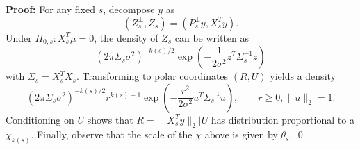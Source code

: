 \documentclass{imsart}
\newcommand{\todo}{\textcolor{red}{\textbf{To do: }}}
\begin{document}
{\bf Proof:}
For any fixed $s$, decompose $y$ as
$$
(Z^{\perp}_s,Z_s) = (P_s^{\perp}y, X_s^Ty).
$$
Under $H_{0,s}:X_s^T\mu=0$, the density of $Z_s$ can be written as
$$
(2 \pi \Sigma_s \sigma^2)^{-k(s)/2} \exp \left(-\frac{1}{2 \sigma^2} z^T\Sigma_s^{-1}z \right)
$$
with $\Sigma_s = X_s^TX_s$.
Transforming to polar coordinates $(R,U)$ yields a density
$$
(2 \pi \Sigma_s \sigma^2)^{-k(s)/2} r^{k(s)-1} \exp \left(-\frac{r^2}{2 \sigma^2} u^T\Sigma_s^{-1}u \right), \qquad r \geq 0, \|u\|_2=1.
$$
Conditioning on $U$ shows that $R=\|X_s^Ty\|_2|U$ has distribution proportional to a $\chi_{k(s)}$. Finally, observe that 
the scale of the $\chi$ above is given by $\theta_s$. \qed

%
%
%
%
%
%
\end{document}
